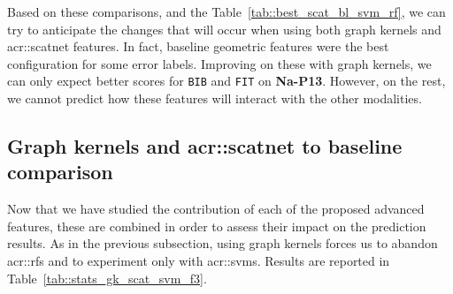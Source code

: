         Based on these comparisons, and the Table~\ref{tab::best_scat_bl_svm_rf}, we can try to anticipate the changes that will occur when using both graph kernels and \gls{acr::scatnet} features.
        In fact, baseline geometric features were the best configuration for some error labels.
        Improving on these with graph kernels, we can only expect better scores for \texttt{BIB} and \texttt{FIT} on \textbf{Na-P13}.
        However, on the rest, we cannot predict how these features will interact with the other modalities.

    \subsection{Graph kernels and \texorpdfstring{\acrshort*{acr::scatnet}}{ScatNet} to baseline comparison}
        \label{subsec::more_experiments::richer_features::graph_kernel_scatnet_baseline}
        Now that we have studied the contribution of each of the proposed advanced features, these are combined in order to assess their impact on the prediction results.
        As in the previous subsection, using graph kernels forces us to abandon \glspl{acr::rf} and to experiment only with \glspl{acr::svm}.
        Results are reported in Table~\ref{tab::stats_gk_scat_svm_f3}.\\
        
